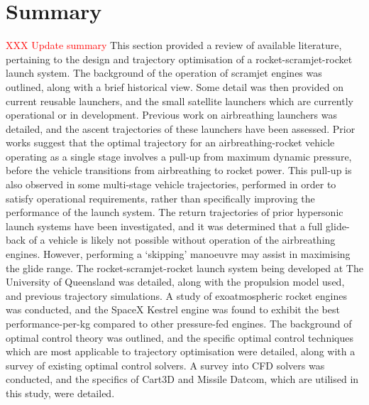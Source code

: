       \section{Summary}
      \textcolor{red}{XXX Update summary}
This section provided a review of available literature, pertaining to the design and trajectory optimisation of a rocket-scramjet-rocket launch system.    
      The background of the operation of scramjet engines was outlined, along with a brief historical view. Some detail was then provided on current reusable launchers, and the small satellite launchers which are currently operational or in development. Previous work on airbreathing launchers was detailed, and the ascent trajectories of these launchers have been assessed. Prior works suggest that the optimal trajectory for an airbreathing-rocket vehicle operating as a single stage involves a pull-up from maximum dynamic pressure, before the vehicle transitions from airbreathing to rocket power. This pull-up is also observed in some multi-stage vehicle trajectories, performed in order to satisfy operational requirements, rather than specifically improving the performance of the launch system. The return trajectories of prior hypersonic launch systems have been investigated, and it was determined that a full glide-back of a vehicle is likely not possible without operation of the airbreathing engines. However, performing a `skipping' manoeuvre may assist in maximising the glide range. 
The rocket-scramjet-rocket launch system being developed at The University of Queensland was detailed, along with the propulsion model used, and previous trajectory simulations. A study of exoatmospheric rocket engines was conducted, and the SpaceX Kestrel engine was found to exhibit the best performance-per-kg compared to other pressure-fed engines. 
The background of optimal control theory was outlined, and the specific optimal control techniques which are most applicable to trajectory optimisation were detailed, along with a survey of existing optimal control solvers. 
A survey into CFD solvers was conducted, and the specifics of Cart3D and Missile Datcom, which are utilised in this study, were detailed. 